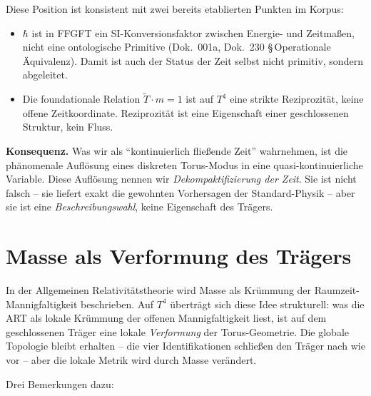 Diese Position ist konsistent mit zwei bereits etablierten Punkten
im Korpus:

\begin{itemize}[leftmargin=2em,itemsep=4pt,topsep=4pt]
  \item $\hbar$ ist in FFGFT ein SI-Konversionsfaktor zwischen
        Energie- und Zeitmaßen, nicht eine ontologische Primitive
        (Dok.~001a, Dok.~230 §\,Operationale Äquivalenz). Damit
        ist auch der Status der Zeit selbst nicht primitiv,
        sondern abgeleitet.
  \item Die foundationale Relation $\tilde T \cdot m = 1$ ist auf
        $T^4$ eine strikte Reziprozität, keine offene
        Zeitkoordinate. Reziprozität ist eine Eigenschaft einer
        geschlossenen Struktur, kein Fluss.
\end{itemize}

\textbf{Konsequenz.} Was wir als \enquote{kontinuierlich fließende Zeit}
wahrnehmen, ist die phänomenale Auflösung eines diskreten
Torus-Modus in eine quasi-kontinuierliche Variable. Diese Auflösung
nennen wir \emph{Dekompaktifizierung der Zeit}. Sie ist nicht falsch
-- sie liefert exakt die gewohnten Vorhersagen der Standard-Physik
-- aber sie ist eine \emph{Beschreibungswahl}, keine Eigenschaft des
Trägers.

\section{Masse als Verformung des Trägers}

In der Allgemeinen Relativitätstheorie wird Masse als Krümmung der
Raumzeit-Mannigfaltigkeit beschrieben. Auf $T^4$ überträgt sich diese
Idee strukturell: was die ART als lokale Krümmung der offenen Mannigfaltigkeit
liest, ist auf dem geschlossenen Träger eine lokale \emph{Verformung}
der Torus-Geometrie. Die globale Topologie bleibt erhalten -- die vier
Identifikationen schließen den Träger nach wie vor -- aber die lokale
Metrik wird durch Masse verändert.

Drei Bemerkungen dazu:

